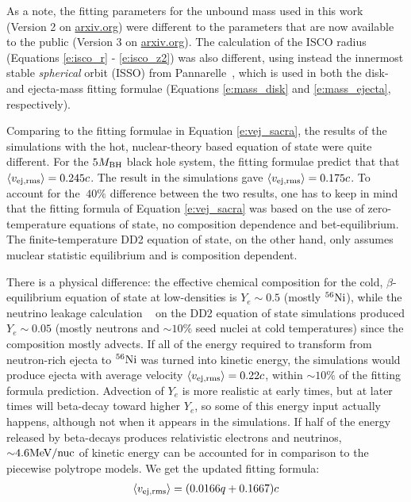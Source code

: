 As a note, the fitting parameters for the unbound mass used in this work (Version 2 on \url{arxiv.org}) were different to the parameters that are now available to the public (Version 3 on \url{arxiv.org}).
The calculation of the ISCO radius (Equations \ref{e:isco_r} - \ref{e:isco_z2}) was also different, using instead the innermost stable \textit{spherical} orbit (ISSO) from Pannarelle~\cite{Pannarale:2014}, which is used in both the disk- and ejecta-mass fitting formulae (Equations \ref{e:mass_disk} and \ref{e:mass_ejecta}, respectively).

Comparing to the fitting formulae in Equation \ref{e:vej_sacra}, the results of the simulations with the hot, nuclear-theory based equation of state were quite different.  
For the $5 M_{\rm BH}$ black hole system, the fitting formulae predict that that 
$\left\langle v_{\rm ej, rms} \right\rangle = 0.245 c$.
The result in the \SpEC simulations gave $\left\langle v_{\rm ej, rms} \right\rangle = 0.175 c$.
To account for the $~40 \%$ difference between the two results, one has to keep in mind that the fitting formula of  Equation \ref{e:vej_sacra} was based on the use of zero-temperature equations of state, no composition dependence and bet-equilibrium.
The finite-temperature DD2 equation of state, on the other hand, only assumes muclear statistic equilibrium and is composition dependent.  

There is a physical difference: the effective chemical composition for the cold, $\beta$-equilibrium equation of state at low-densities is $Y_e \sim 0.5$ (mostly $^{56}{\rm Ni}$), while the neutrino leakage calculation ~\cite{Ruffert1996,Rosswog:2003rv,OConnor2010} on the DD2 equation of state simulations produced $Y_e \sim 0.05$ (mostly neutrons and $\sim 10\%$ seed nuclei at cold temperatures) since the composition mostly advects.
If all of the energy required to transform from neutron-rich ejecta to $^{56}{\rm Ni}$ was turned into kinetic energy, the simulations would produce ejecta with average velocity $\left\langle v_{\rm ej, rms} \right\rangle = 0.22 c$, within $\sim 10\%$ of the fitting formula prediction.
Advection of $Y_e$ is more realistic at early times, but at later times will beta-decay toward higher $Y_e$, so some of this energy input actually happens, although not when it appears in the \SACRA simulations.
If half of the energy released by beta-decays produces relativistic electrons and neutrinos, $\mathord{\sim} 4.6 {\rm MeV/nuc}$ of kinetic energy can be accounted for in comparison to the piecewise polytrope models.
We get the updated fitting formula:
\begin{align}
\label{e:vej_spec}
\left\langle v_{\rm ej, rms} \right\rangle = (0.0166 q + 0.1667) c
\end{align}


